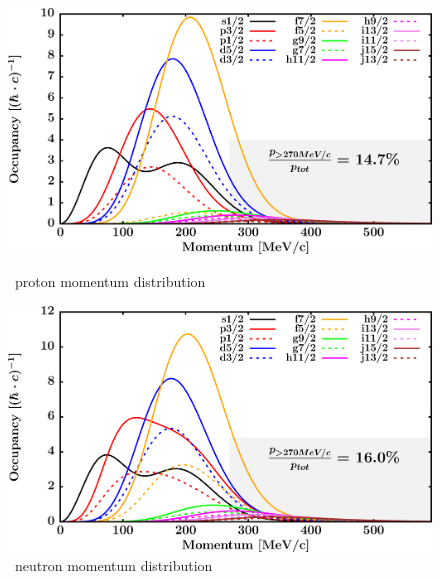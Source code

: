 \begin{figure}[hbtp]
    \centering
    \begin{minipage}{0.45\textwidth}
        \centering
        \includegraphics[width=\textwidth]{figures/ni64_protonLJMomentumDistIntegral.png}
        \caption*{\niFour\ proton momentum distribution}
        \label{DOMFitData_ni64_proton_momentumDist}
    \end{minipage}\hspace{6pt}
    \begin{minipage}{0.45\textwidth}
        \centering
        \includegraphics[width=\textwidth]{figures/ni64_neutronLJMomentumDistIntegral.png}
        \caption*{\niFour\ neutron momentum distribution}
        \label{DOMFitData_ni64_neutron_momentumDist}
    \end{minipage}
\end{figure}
\vspace{0.3in}
